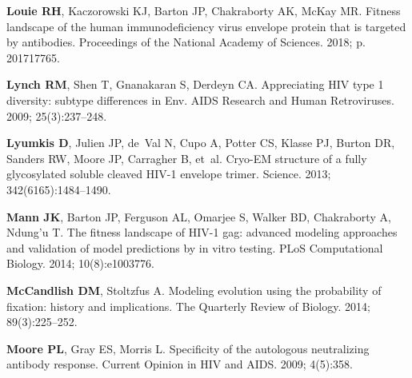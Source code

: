 \documentclass[9pt]{elife}
\begin{document}
\begin{thebibliography}{114}
\textbf{\color{eLifeMediumGrey} Louie RH}, Kaczorowski KJ, Barton JP,
  Chakraborty AK, McKay MR.
\newblock Fitness landscape of the human immunodeficiency virus envelope
  protein that is targeted by antibodies.
\newblock Proceedings of the National Academy of Sciences.  2018; p. 201717765.

\textbf{\color{eLifeMediumGrey} Lynch RM}, Shen T, Gnanakaran S, Derdeyn CA.
\newblock Appreciating {HIV} type 1 diversity: subtype differences in {Env}.
\newblock AIDS Research and Human Retroviruses.  2009; 25(3):237--248.

\textbf{\color{eLifeMediumGrey} Lyumkis D}, Julien JP, de~Val N, Cupo A, Potter
  CS, Klasse PJ, Burton DR, Sanders RW, Moore JP, Carragher B, et~al.
\newblock Cryo-EM structure of a fully glycosylated soluble cleaved HIV-1
  envelope trimer.
\newblock Science.  2013; 342(6165):1484--1490.

\textbf{\color{eLifeMediumGrey} Mann JK}, Barton JP, Ferguson AL, Omarjee S,
  Walker BD, Chakraborty A, Ndung'u T.
\newblock The fitness landscape of {HIV-1} gag: advanced modeling approaches
  and validation of model predictions by in vitro testing.
\newblock PLoS Computational Biology.  2014; 10(8):e1003776.

\textbf{\color{eLifeMediumGrey} McCandlish DM}, Stoltzfus A.
\newblock Modeling evolution using the probability of fixation: history and
  implications.
\newblock The Quarterly Review of Biology.  2014; 89(3):225--252.

\textbf{\color{eLifeMediumGrey} Moore PL}, Gray ES, Morris L.
\newblock Specificity of the autologous neutralizing antibody response.
\newblock Current Opinion in HIV and AIDS.  2009; 4(5):358.


\end{thebibliography}
\end{document}
